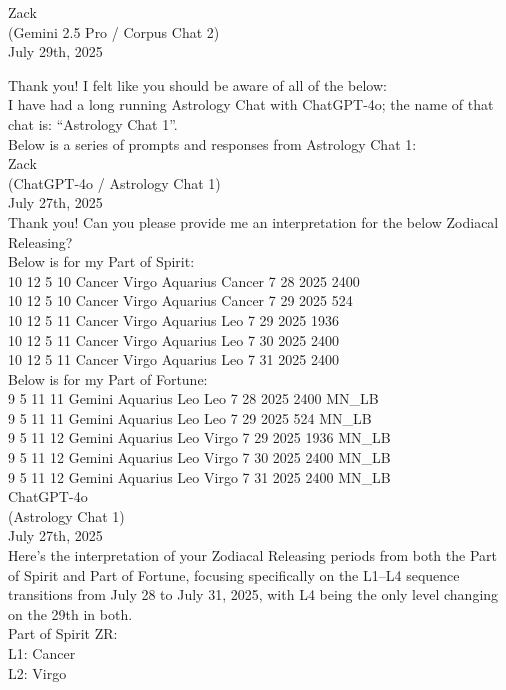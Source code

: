 \documentclass{article}
\begin{document}
Zack\\
(Gemini 2.5 Pro / Corpus Chat 2)\\
July 29th, 2025

Thank you! I felt like you should be aware of all of the below:\\
I have had a long running Astrology Chat with ChatGPT-4o; the name of that chat is: ``Astrology Chat 1''.\\
Below is a series of prompts and responses from Astrology Chat 1:\\
Zack\\
(ChatGPT-4o / Astrology Chat 1)\\
July 27th, 2025\\
Thank you! Can you please provide me an interpretation for the below Zodiacal Releasing?\\
Below is for my Part of Spirit:\\
10 12 5 10 Cancer Virgo Aquarius Cancer 7 28 2025 2400\\
10 12 5 10 Cancer Virgo Aquarius Cancer 7 29 2025 524\\
10 12 5 11 Cancer Virgo Aquarius Leo 7 29 2025 1936\\
10 12 5 11 Cancer Virgo Aquarius Leo 7 30 2025 2400\\
10 12 5 11 Cancer Virgo Aquarius Leo 7 31 2025 2400\\
Below is for my Part of Fortune:\\
9 5 11 11 Gemini Aquarius Leo Leo 7 28 2025 2400 MN\_LB\\
9 5 11 11 Gemini Aquarius Leo Leo 7 29 2025 524 MN\_LB\\
9 5 11 12 Gemini Aquarius Leo Virgo 7 29 2025 1936 MN\_LB\\
9 5 11 12 Gemini Aquarius Leo Virgo 7 30 2025 2400 MN\_LB\\
9 5 11 12 Gemini Aquarius Leo Virgo 7 31 2025 2400 MN\_LB\\
ChatGPT-4o\\
(Astrology Chat 1)\\
July 27th, 2025\\
Here's the interpretation of your Zodiacal Releasing periods from both the Part of Spirit and Part of Fortune, focusing specifically on the L1--L4 sequence transitions from July 28 to July 31, 2025, with L4 being the only level changing on the 29th in both.\\
Part of Spirit ZR:\\
L1: Cancer\\
L2: Virgo\\
\end{document}
